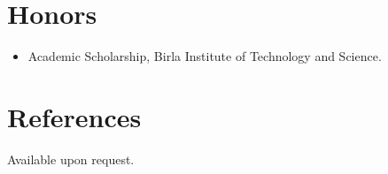 \documentclass[a4paper,11pt]{article}
\begin{document}
\section*{Honors}
\begin{itemize}
    \item Academic Scholarship, Birla Institute of Technology and Science.
\end{itemize}


\section*{References}
Available upon request.
\end{document}
